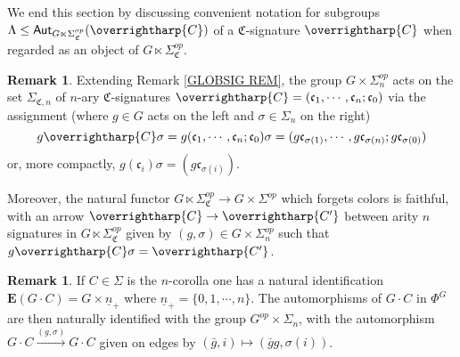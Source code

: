 \documentclass[a4paper,10pt
,draft
]{article}%
\numberwithin{equation}{section}
\numberwithin{figure}{section}
\theoremstyle{definition} %
\newtheorem{remark}[equation]{Remark}%
\newcommand{\vect}[1]{\text{\overrightharp{\ensuremath{#1}}}}
\newcommand{\1}{\ensuremath{\mathbbm 1}}%
\begin{document}
We end this section by discussing convenient notation  
for subgroups 
$\Lambda \leq \mathsf{Aut}_{G \ltimes \Sigma_{\mathfrak{C}}^{op}}(\vect{C})$
of a $\mathfrak{C}$-signature $\vect{C}$
when regarded as an object of 
$G \ltimes \Sigma_{\mathfrak{C}}^{op}$.



\begin{remark}\label{SIGACT REM}
Extending Remark \ref{GLOBSIG REM}, 
the group $G \times \Sigma_n^{op}$
acts on the set $\Sigma_{\mathfrak{C},n}$
of $n$-ary $\mathfrak{C}$-signatures
$\vect{C} = (\mathfrak{c}_1,\cdots,\mathfrak{c}_n;\mathfrak{c}_0)$
via the assignment (where $g \in G$ acts on the left and $\sigma \in \Sigma_n$ on the right)
\begin{equation}\label{SIGACT_EQ}
	g \vect{C} \sigma =
	g (\mathfrak{c}_1,\cdots,\mathfrak{c}_n;\mathfrak{c}_0) \sigma
=
	(g\mathfrak{c}_{\sigma(1)},\cdots,g\mathfrak{c}_{\sigma(n)};g\mathfrak{c}_{\sigma(0)})
\end{equation}
or, more compactly, $g (\mathfrak{c}_i) \sigma = (g \mathfrak{c}_{\sigma(i)})$.

Moreover, the natural functor 
$G \ltimes \Sigma^{op}_{\mathfrak{C}}
\to G \times \Sigma^{op}$
which forgets colors is faithful,
with an arrow
$\vect{C} \to \vect{C'}$
between arity $n$ signatures
in $G \ltimes \Sigma_{\mathfrak{C}}^{op}$
given by 
$(g,\sigma) \in G \times \Sigma_n^{op}$
such that
$g \vect{C} \sigma = \vect{C'}$.
\end{remark}



\begin{remark}\label{GCDOTCATS REM}
If  $C \in \Sigma$ is the $n$-corolla
one has a natural identification
$\boldsymbol{E}(G\cdot C) = G \times \underline{n}_+$
where
$\underline{n}_+ = \{0,1,\cdots,n\}$.
The automorphisms of
$G \cdot C$ in $\Phi^G$
are then naturally identified with the group
$G^{op} \times \Sigma_n$,
with the automorphism
$G \cdot C \xrightarrow{(g,\sigma)} G \cdot C$
given on edges by
$(\bar{g},i) \mapsto (\bar{g}g,\sigma(i))$.
\end{remark}

 
\end{document}
